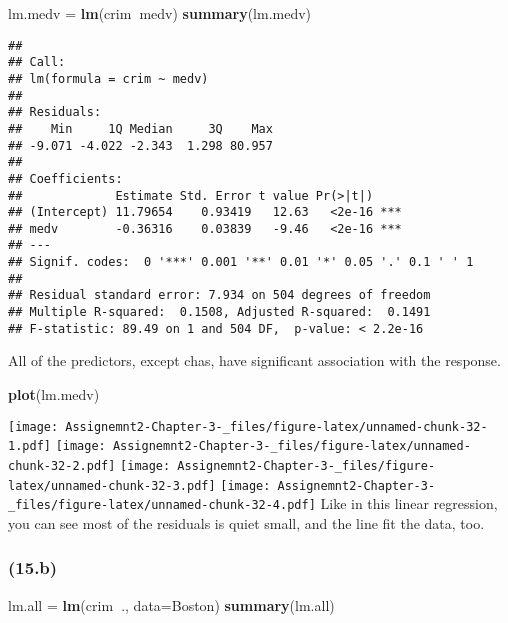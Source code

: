 \documentclass[]{article}
\newenvironment{Shaded}{\begin{snugshade}}{\end{snugshade}}
\newcommand{\DataTypeTok}[1]{\textcolor[rgb]{0.13,0.29,0.53}{#1}}
\newcommand{\KeywordTok}[1]{\textcolor[rgb]{0.13,0.29,0.53}{\textbf{#1}}}
\newcommand{\NormalTok}[1]{#1}
\newcommand{\OperatorTok}[1]{\textcolor[rgb]{0.81,0.36,0.00}{\textbf{#1}}}
\newcommand{\StringTok}[1]{\textcolor[rgb]{0.31,0.60,0.02}{#1}}
\begin{document}
\begin{Shaded}
\begin{Highlighting}[]
\NormalTok{lm.medv =}\StringTok{ }\KeywordTok{lm}\NormalTok{(crim}\OperatorTok{~}\NormalTok{medv)}
\KeywordTok{summary}\NormalTok{(lm.medv)}
\end{Highlighting}
\end{Shaded}

\begin{verbatim}
## 
## Call:
## lm(formula = crim ~ medv)
## 
## Residuals:
##    Min     1Q Median     3Q    Max 
## -9.071 -4.022 -2.343  1.298 80.957 
## 
## Coefficients:
##             Estimate Std. Error t value Pr(>|t|)    
## (Intercept) 11.79654    0.93419   12.63   <2e-16 ***
## medv        -0.36316    0.03839   -9.46   <2e-16 ***
## ---
## Signif. codes:  0 '***' 0.001 '**' 0.01 '*' 0.05 '.' 0.1 ' ' 1
## 
## Residual standard error: 7.934 on 504 degrees of freedom
## Multiple R-squared:  0.1508, Adjusted R-squared:  0.1491 
## F-statistic: 89.49 on 1 and 504 DF,  p-value: < 2.2e-16
\end{verbatim}

All of the predictors, except chas, have significant association with
the response.

\begin{Shaded}
\begin{Highlighting}[]
\KeywordTok{plot}\NormalTok{(lm.medv)}
\end{Highlighting}
\end{Shaded}

\texttt{[image: Assignemnt2-Chapter-3-\_files/figure-latex/unnamed-chunk-32-1.pdf]}
\texttt{[image: Assignemnt2-Chapter-3-\_files/figure-latex/unnamed-chunk-32-2.pdf]}
\texttt{[image: Assignemnt2-Chapter-3-\_files/figure-latex/unnamed-chunk-32-3.pdf]}
\texttt{[image: Assignemnt2-Chapter-3-\_files/figure-latex/unnamed-chunk-32-4.pdf]}
Like in this linear regression, you can see most of the residuals is
quiet small, and the line fit the data, too.

\hypertarget{b-3}{%
\subsubsection{(15.b)}\label{b-3}}

\begin{Shaded}
\begin{Highlighting}[]
\NormalTok{lm.all =}\StringTok{ }\KeywordTok{lm}\NormalTok{(crim}\OperatorTok{~}\NormalTok{., }\DataTypeTok{data=}\NormalTok{Boston)}
\KeywordTok{summary}\NormalTok{(lm.all)}
\end{Highlighting}
\end{Shaded}
\end{document}
